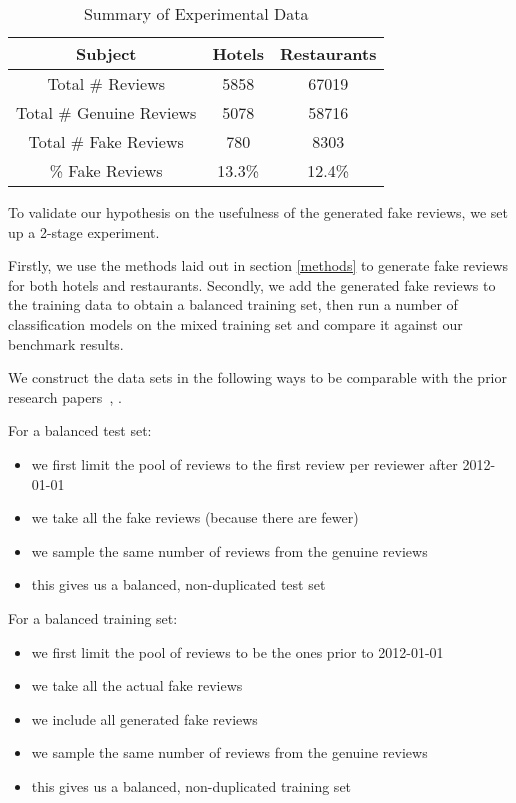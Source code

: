 \documentclass[conference]{IEEEtran} %
\theoremstyle{plain}
\theoremstyle{definition}
\begin{document}
\begin{table}[h]
\normalsize
\caption{Summary of Experimental Data}
\centering
\begin{tabular}{|c|c|c|}
\hline
Subject & Hotels & Restaurants \\ \hline
Total \# Reviews & 5858 & 67019 \\ \hline
Total \# Genuine Reviews & 5078 & 58716 \\ \hline
Total \# Fake Reviews & 780 &  8303 \\ \hline
\% Fake Reviews & 13.3\% & 12.4\%  \\ 
\hline
\end{tabular}
\label{original-data}

\end{table}

To validate our hypothesis on the usefulness of the generated fake reviews, we set up a 2-stage experiment.

Firstly, we use the methods laid out in section \ref{methods} to generate fake reviews for both hotels and restaurants. Secondly, we add the generated fake reviews to the training data to obtain a balanced training set, then run a number of classification models on the mixed training set and compare it against our benchmark results.

We construct the data sets in the following ways to be comparable with the prior research papers~\cite{wang2017handling}, \cite{Tang2020}.

For a balanced test set:
\begin{itemize}
\setlength\itemsep{0em}
\item we first limit the pool of reviews to the first review per reviewer after 2012-01-01
\item we take all the fake reviews (because there are fewer)
\item we sample the same number of reviews from the genuine reviews
\item this gives us a balanced, non-duplicated test set
\end{itemize}

For a balanced training set:
\begin{itemize}
\setlength\itemsep{0em}
\item we first limit the pool of reviews to be the ones prior to 2012-01-01
\item we take all the actual fake reviews
\item we include all generated fake reviews
\item we sample the same number of reviews from the genuine reviews
\item this gives us a balanced, non-duplicated training set
\end{itemize}
\end{document}
